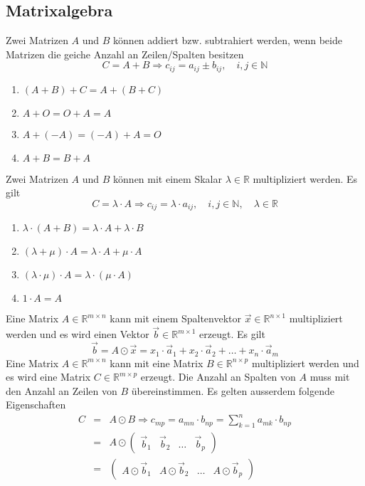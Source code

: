 \subsection{Matrixalgebra}
Zwei Matrizen $A$ und $B$ können addiert bzw. subtrahiert werden, wenn beide Matrizen die geiche Anzahl an Zeilen/Spalten besitzen
\begin{equation}
\boxed{C=A+B\Rightarrow c_{ij}=a_{ij}\pm b_{ij},\quad i,j\in \mathbb{N}}
\end{equation}
\begin{enumerate}[$(i)$]
\item $\left(A+B\right)+C=A+\left(B+C\right)$
\item $A+O=O+A=A$
\item $A+(-A)=(-A)+A=O$
\item $A+B=B+A$
\end{enumerate}
Zwei Matrizen $A$ und $B$ können mit einem Skalar $\lambda\in\mathbb{R}$ multipliziert werden. Es gilt
\begin{equation}
\boxed{C=\lambda\cdot A\Rightarrow c_{ij}=\lambda\cdot a_{ij},\quad i,j\in\mathbb{N},\quad \lambda\in\mathbb{R}}
\end{equation}
\begin{enumerate}[$(i)$]
\item $\lambda\cdot \left(A+B\right)=\lambda\cdot A+\lambda\cdot B$
\item $\left(\lambda+\mu\right)\cdot A=\lambda\cdot A+\mu\cdot A$
\item $\left(\lambda\cdot \mu\right)\cdot A=\lambda\cdot\left(\mu\cdot A\right)$
\item $1\cdot A=A$
\end{enumerate}
Eine Matrix $A\in\mathbb{R}^{m\times n}$ kann mit einem Spaltenvektor $\overrightarrow{x}\in\mathbb{R}^{n\times 1}$ multipliziert werden und es wird einen Vektor $\overrightarrow{b}\in\mathbb{R}^{m\times 1}$ erzeugt. Es gilt
\begin{equation}
\boxed{\overrightarrow{b}=A\odot \overrightarrow{x}=x_1\cdot \overrightarrow{a}_1+x_2\cdot \overrightarrow{a}_2+\dotso+x_n\cdot \overrightarrow{a}_m}
\end{equation}
Eine Matrix $A\in\mathbb{R}^{m\times n}$ kann mit eine Matrix $B\in\mathbb{R}^{n\times p}$ multipliziert werden und es wird eine Matrix $C\in\mathbb{R}^{m\times p}$ erzeugt. Die Anzahl an Spalten von $A$ muss mit den Anzahl an Zeilen von $B$ übereinstimmen. Es gelten ausserdem folgende Eigenschaften
\begin{equation}  
\boxed{\begin{array}{lll}  
C&=&A\odot B\Rightarrow c_{mp}=a_{mn}\cdot b_{np}=\displaystyle \sum_{k=1}^na_{mk}\cdot b_{np}\\
&=&A\odot \begin{pmatrix}\overrightarrow{b}_1&\overrightarrow{b}_2&\dotso&\overrightarrow{b}_p\end{pmatrix}\\
&=&\begin{pmatrix}A\odot \overrightarrow{b}_1&A\odot \overrightarrow{b}_2&\dotso&A\odot \overrightarrow{b}_p\end{pmatrix}\\
\end{array}}  
\end{equation}
